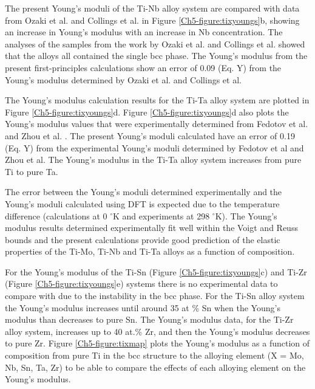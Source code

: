 The present Young's moduli of the Ti-Nb alloy system are compared with data from Ozaki et al. \cite{Ozaki2004} and Collings et al. \cite{Boyer1994} in Figure \ref{Ch5-figure:tixyoungs}b, showing an increase in Young's modulus with an increase in Nb concentration. The analyses of the samples from the work by Ozaki et al. and Collings et al. showed that the alloys all contained the single bcc phase. The Young's modulus from the present first-principles calculations show an error of 0.09 (Eq. Y) from the Young's modulus determined by Ozaki et al. and Collings et al. 

The Young's modulus calculation results for the Ti-Ta alloy system are plotted in Figure \ref{Ch5-figure:tixyoungs}d. Figure \ref{Ch5-figure:tixyoungs}d also plots the Young's modulus values that were experimentally determined from Fedotov et al. \cite{Fedotov1985} and Zhou et al. \cite{Zhou2009a,Zhou2004a}. The present Young's moduli calculated have an error of 0.19 (Eq. Y) from the experimental Young's moduli determined by Fedotov et al and Zhou et al. The Young's modulus in the Ti-Ta alloy system increases from pure Ti to pure Ta. 

The error between the Young's moduli determined experimentally and the Young's moduli calculated using DFT is expected due to the temperature difference (calculations at 0 $^\circ$K and experiments at 298 $^\circ$K). The Young's modulus results determined experimentally fit well within the Voigt and Reuss bounds and the present calculations provide good prediction of the elastic properties of the Ti-Mo, Ti-Nb and Ti-Ta alloys as a function of composition.

For the Young's modulus of the Ti-Sn (Figure \ref{Ch5-figure:tixyoungs}c) and Ti-Zr (Figure \ref{Ch5-figure:tixyoungs}e)  systems there is no experimental data to compare with due to the instability in the bcc phase. For the Ti-Sn alloy system the Young's modulus increases until around 35 at \% Sn when the Young's modulus than decreases to pure Sn. The Young's modulus data, for the Ti-Zr alloy system, increases up to 40 at.\% Zr, and then the Young's modulus decreases to pure Zr. Figure \ref{Ch5-figure:tixmap} plots the Young's modulus as a function of composition from pure Ti in the bcc structure to the alloying element (X = Mo, Nb, Sn, Ta, Zr) to be able to compare the effects of each alloying element on the Young's modulus.

